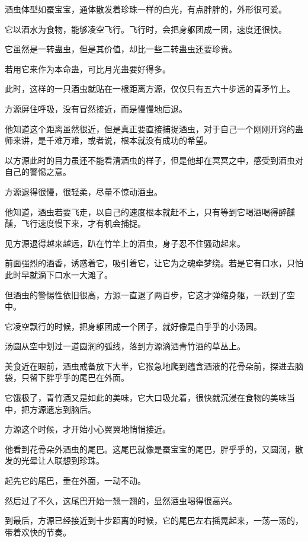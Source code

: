 
\begin{this_body}

酒虫体型如蚕宝宝，通体散发着珍珠一样的白光，有点胖胖的，外形很可爱。

它以酒水为食物，能够凌空飞行。飞行时，会把身躯团成一团，速度还很快。

它虽然是一转蛊虫，但是其价值，却比一些二转蛊虫还要珍贵。

若用它来作为本命蛊，可比月光蛊要好得多。

此时，这样的一只酒虫就贴在一根距离方源，仅仅只有五六十步远的青矛竹上。

方源屏住呼吸，没有冒然接近，而是慢慢地后退。

他知道这个距离虽然很近，但是真正要直接捕捉酒虫，对于自己一个刚刚开窍的蛊师来讲，是千难万难，或者说，根本就没有成功的希望。

以方源此时的目力虽还不能看清酒虫的样子，但是他却在冥冥之中，感受到酒虫对自己的警惕之意。

方源退得很慢，很轻柔，尽量不惊动酒虫。

他知道，酒虫若要飞走，以自己的速度根本就赶不上，只有等到它喝酒喝得醉醺醺，飞行速度慢下来，才有机会捕捉。

见方源退得越来越远，趴在竹竿上的酒虫，身子忍不住骚动起来。

前面强烈的酒香，诱惑着它，吸引着它，让它为之魂牵梦绕。若是它有口水，只怕此时早就滴下口水一大滩了。

但酒虫的警惕性依旧很高，方源一直退了两百步，它这才弹缩身躯，一跃到了空中。

它凌空飘行的时候，把身躯团成一个团子，就好像是白乎乎的小汤圆。

汤圆从空中划过一道圆润的弧线，落到方源滴洒青竹酒的草丛上。

美食近在眼前，酒虫戒备放下大半，它猴急地爬到蕴含酒液的花骨朵前，探进去脑袋，只留下胖乎乎的尾巴在外面。

它饿极了，青竹酒又是如此的美味，它大口吸允着，很快就沉浸在食物的美味当中，把方源遗忘到脑后。

方源这个时候，才开始小心翼翼地悄悄接近。

他看到花骨朵外酒虫的尾巴。这尾巴就像是蚕宝宝的尾巴，胖乎乎的，又圆润，散发的光晕让人联想到珍珠。

起先它的尾巴，垂在外面，一动不动。

然后过了不久，这尾巴开始一翘一翘的，显然酒虫喝得很高兴。

到最后，方源已经接近到十步距离的时候，它的尾巴左右摇晃起来，一荡一荡的，带着欢快的节奏。


\end{this_body}
